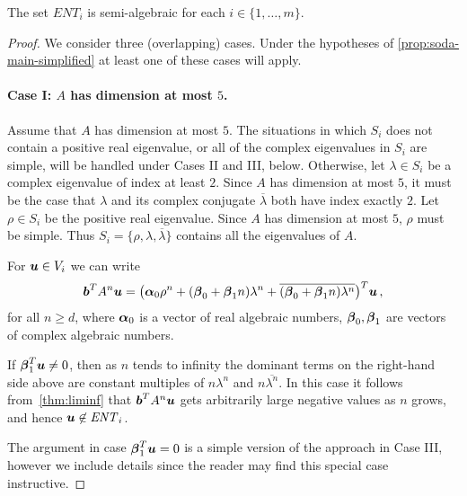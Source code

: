 \begin{proposition}
The set $\mathit{ENT}_i$ is semi-algebraic for each $i\in \lbrace 1,\ldots,m\rbrace$.
\label{prop:semi-alg}
\end{proposition}
\begin{proof}
  We consider three (overlapping) cases.  Under the hypotheses of
  \cref{prop:soda-main-simplified} at least one of these cases will apply.

\paragraph{Case I: $A$ has dimension at most $5$.}
Assume that $A$ has dimension at most $5$.  The situations in which
$S_i$ does not contain a positive real eigenvalue, or
all of the complex eigenvalues in $S_i$ are simple, will be handled
under Cases II and III, below.  Otherwise, let $\lambda\in S_i$ be a complex
eigenvalue of index at least $2$.  Since $A$ has dimension at most
$5$, it must be the case that $\lambda$ and its complex conjugate
$\overline{\lambda}$ both have index exactly $2$.  Let $\rho \in S_i$
be the positive real eigenvalue.  Since
$A$ has dimension at most $5$, $\rho$ must be simple.  Thus
$S_i=\lbrace \rho,\lambda,\overline{\lambda}\rbrace$ contains all the eigenvalues
of $A$.

For $\boldsymbol{u}\in V_i$ we can write
\begin{align*}
\myvector{b}^TA^n\myvector{u} =
\big(\myvector{\alpha}_0\rho^n  + (\myvector{\beta}_0+ \myvector{\beta}_1n)\lambda^n
 + \overline{(\myvector{\beta}_0+\myvector{\beta}_1n)
\lambda^n}\big)^T\myvector{u} \, ,
\label{eq:small}
\end{align*}
for all $n\geq d$,
where $\boldsymbol{\alpha}_0$ is a vector of real algebraic numbers,
$\boldsymbol{\beta}_0,\boldsymbol{\beta}_1$ are vectors of complex
algebraic numbers.

If $\boldsymbol{\beta}_1^T\boldsymbol{u}\neq 0$, then as $n$ tends to
infinity the dominant terms on the right-hand side above are constant
multiples of $n\lambda^n$ and $n\overline{\lambda^n}$.  In this case
it follows from~\cref{thm:liminf} that
$\boldsymbol{b}^{T} A^{n}\boldsymbol{u}$ gets arbitrarily large negative values as
$n$ grows, and hence $\boldsymbol{u}\not\in\mathit{ENT}_i$.

The argument in case $\boldsymbol{\beta}_1^T\boldsymbol{u}=0$ is a
simple version of the approach in Case III, however we include details
since the reader may find this special case instructive.


\end{proof}
